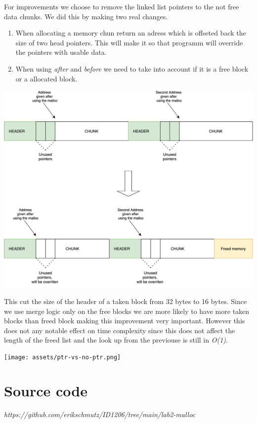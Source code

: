 \documentclass{article}
\begin{document}
For improvements we choose to remove the linked list pointers to the not free data chunks. We did this by making two real changes.

\begin{enumerate}
    \item When allocating a memory chun return an adress which is offseted back the size of two head pointers. This will make it so that programm will override the pointers with usable data.
    \item When using \emph{after} and \emph{before} we need to take into account if it is a free block or a allocated block. 
\end{enumerate}



\begin{center}
    \includegraphics[scale=0.12]{images/no-pointer-on-taken.png}
\end{center}
     
     
This cut the size of the header of a taken block from 32 bytes to 16 bytes. Since we use merge logic only on the free blocks we are more likely to have more taken blocks than freed block making this improvement very important. 
However this does not any notable effect on time complexity since this does not affect the length of the freed list and the look up from the previouse is still in \emph{O(1)}.

\begin{center}
    \texttt{[image: assets/ptr-vs-no-ptr.png]}
\end{center}

\section{Source code}


\emph{https://github.com/erikschmutz/ID1206/tree/main/lab2-malloc}
\end{document}
